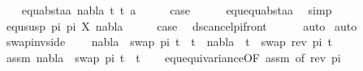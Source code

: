 \begin{isabellebody}
\isanewline
\ \ \isamarkupfalse%
\ {\isacharparenleft}{\kern0pt}equ{\isacharunderscore}{\kern0pt}abst{\isacharunderscore}{\kern0pt}aa\ nabla\ t{}{\isacharprime}{\kern0pt}\ t{}{\isacharprime}{\kern0pt}\ a{\isacharparenright}{\kern0pt}\isanewline
\ \ \isamarkupfalse%
\ \isamarkupfalse%
\ {\isacharquery}{\kern0pt}case\isanewline
\ \ \ \ \isamarkupfalse%
\ equ{\isachardot}{\kern0pt}equ{\isacharunderscore}{\kern0pt}abst{\isacharunderscore}{\kern0pt}aa\ \isamarkupfalse%
\ simp\isanewline
{}\isamarkupfalse%
\isanewline
\ \ \isamarkupfalse%
\ {\isacharparenleft}{\kern0pt}equ{\isacharunderscore}{\kern0pt}susp\ pi{}\ pi{}\ X\ nabla{\isacharparenright}{\kern0pt}\isanewline
\ \ \isamarkupfalse%
\ \isamarkupfalse%
\ {\isacharquery}{\kern0pt}case\ \isamarkupfalse%
\ ds{\isacharunderscore}{\kern0pt}cancel{\isacharunderscore}{\kern0pt}pi{\isacharunderscore}{\kern0pt}front\isanewline
\ \ \ \ \isamarkupfalse%
\ auto\isanewline
{}\isamarkupfalse%
\ {\isacharparenleft}{\kern0pt}auto{\isacharparenright}{\kern0pt}%
\endisatagproof
{\isafoldproof}%
%
\isadelimproof
\isanewline
%
\endisadelimproof
\isanewline
{}\isamarkupfalse%
\ swap{\isacharunderscore}{\kern0pt}inv{\isacharunderscore}{\kern0pt}side{\isacharcolon}{\kern0pt}\ \isanewline
\ \ \ {\isachardoublequoteopen}nabla\ {\isasymturnstile}\ swap\ pi\ t{}\ {\isasymapprox}\ t{}\ {\isacharequal}{\kern0pt}\ nabla\ {\isasymturnstile}\ t{}\ {\isasymapprox}\ swap\ {\isacharparenleft}{\kern0pt}rev\ pi{\isacharparenright}{\kern0pt}\ t{}{\isachardoublequoteclose}\isanewline
%
\isadelimproof
%
\endisadelimproof
%
\isatagproof
{}\isamarkupfalse%
\isanewline
\ \ \isanewline
\ \ \isakeywordONE{{\isacharbraceleft}{\kern0pt}}\isamarkupfalse%
\isamarkupfalse%
\ assm{}{\isacharcolon}{\kern0pt}\ {\isachardoublequoteopen}nabla\ {\isasymturnstile}\ swap\ pi\ t{}\ {\isasymapprox}\ t{}{\isachardoublequoteclose}\isanewline
\ \ \isamarkupfalse%
\ equ{\isacharunderscore}{\kern0pt}equivariance{\isacharbrackleft}{\kern0pt}OF\ assm{}{\isacharcomma}{\kern0pt}\ of\ {\isacartoucheopen}rev\ pi{\isacartoucheclose}{\isacharbrackright}{\kern0pt}\isanewline
\ \ \isamarkupfalse%

\end{isabellebody}
